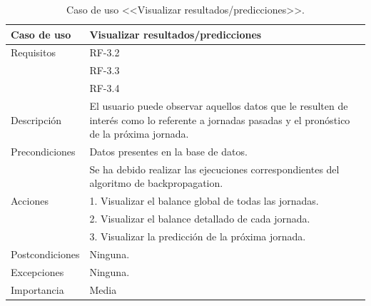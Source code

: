  \begin{table}
  \begin{center}
   \begin{tabular}{|p{3cm} | p{9cm} |}
    \hline
    Caso de uso & Visualizar resultados/predicciones\\
    \hline
    Requisitos & RF-3.2\\
    & RF-3.3\\
    & RF-3.4\\
    \hline
    Descripción & El usuario puede observar aquellos datos que le resulten de interés como lo referente a jornadas pasadas y el pronóstico de la próxima jornada.\\
    \hline
    Precondiciones &Datos presentes en la base de datos.\\
    			&Se ha debido realizar las ejecuciones correspondientes del algoritmo de backpropagation.\\
    \hline
  	Acciones & 1. Visualizar el balance global de todas las jornadas.\\
    &2. Visualizar el balance detallado de cada jornada.\\
    &3. Visualizar la predicción de la próxima jornada.\\
    \hline
    Postcondiciones & Ninguna. \\
    \hline
    Excepciones & Ninguna.\\
    \hline
    Importancia & Media\\
    \hline
   \end{tabular}
   \caption{Caso de uso <<Visualizar resultados/predicciones>>.}
   \label{tabla:casoUso3.2}
  \end{center}
 \end{table}